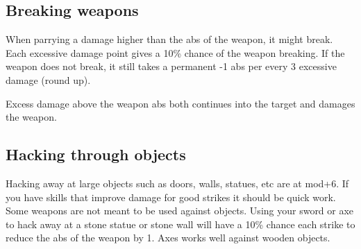\subsection*{Breaking weapons}
When parrying a damage higher than the abs of the weapon, it might break.
Each excessive damage point gives a 10\% chance of the weapon breaking.
If the weapon does not break, it still takes a permanent -1 abs per every 3 excessive damage (round up).

Excess damage above the weapon abs both continues into the target and damages the weapon.


%




\subsection*{Hacking through objects}
Hacking away at large objects such as doors, walls, statues, etc are at mod+6. If you have skills that improve damage for good strikes it should be quick work.
Some weapons are not meant to be used against objects. Using your sword or axe to hack away at a stone statue or stone wall will have a 10\% chance each strike to reduce the abs of the weapon by 1. Axes works well against wooden objects.

